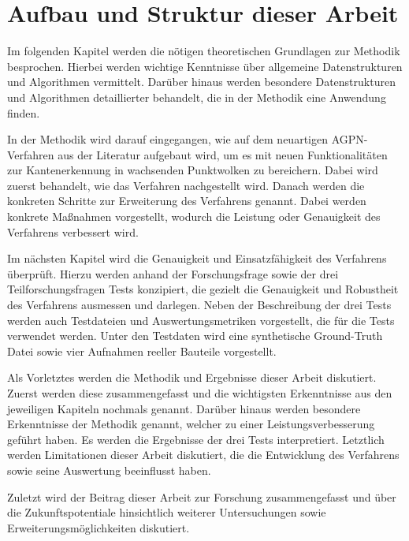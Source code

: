 \section{Aufbau und Struktur dieser Arbeit}
Im folgenden Kapitel werden die nötigen theoretischen Grundlagen zur Methodik besprochen. Hierbei werden wichtige Kenntnisse über allgemeine Datenstrukturen und Algorithmen vermittelt. Darüber hinaus werden besondere Datenstrukturen und Algorithmen detaillierter behandelt, die in der Methodik eine Anwendung finden. 

In der Methodik wird darauf eingegangen, wie auf dem neuartigen AGPN-Verfahren aus der Literatur aufgebaut wird, um es mit neuen Funktionalitäten zur Kantenerkennung in wachsenden Punktwolken zu bereichern. Dabei wird zuerst behandelt, wie das Verfahren nachgestellt wird. Danach werden die konkreten Schritte zur Erweiterung des Verfahrens genannt. Dabei werden konkrete Maßnahmen vorgestellt, wodurch die Leistung oder Genauigkeit des Verfahrens verbessert wird. 

Im nächsten Kapitel wird die Genauigkeit und Einsatzfähigkeit des Verfahrens überprüft. Hierzu werden anhand der Forschungsfrage sowie der drei Teilforschungsfragen Tests konzipiert, die gezielt die Genauigkeit und Robustheit des Verfahrens ausmessen und darlegen. Neben der Beschreibung der drei Tests werden auch Testdateien und Auswertungsmetriken vorgestellt, die für die Tests verwendet werden. Unter den Testdaten wird eine synthetische Ground-Truth Datei sowie vier Aufnahmen reeller Bauteile vorgestellt. 

Als Vorletztes werden die Methodik und Ergebnisse dieser Arbeit diskutiert. Zuerst werden diese zusammengefasst und die wichtigsten Erkenntnisse aus den jeweiligen Kapiteln nochmals genannt. Darüber hinaus werden besondere Erkenntnisse der Methodik genannt, welcher zu einer Leistungsverbesserung geführt haben. Es werden die Ergebnisse der drei Tests interpretiert. Letztlich werden Limitationen dieser Arbeit diskutiert, die die Entwicklung des Verfahrens sowie seine Auswertung beeinflusst haben. 

Zuletzt wird der Beitrag dieser Arbeit zur Forschung zusammengefasst und über die Zukunftspotentiale hinsichtlich weiterer Untersuchungen sowie Erweiterungsmöglichkeiten diskutiert.